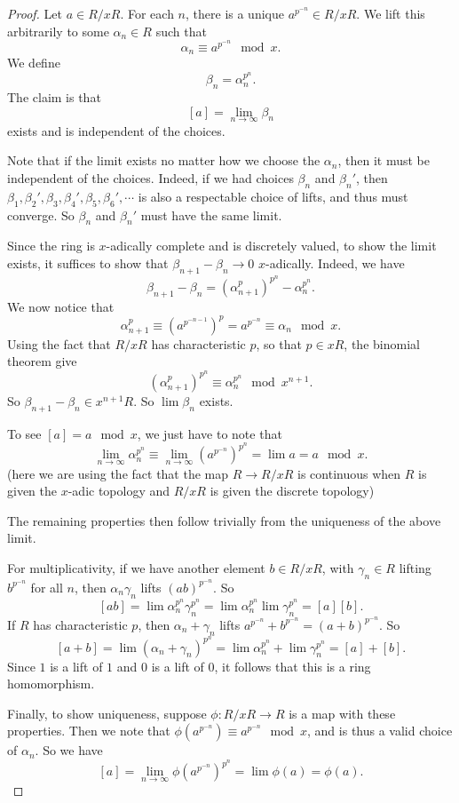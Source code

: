 \documentclass[a4paper]{article}
\begin{document}
\begin{proof}
  Let $a \in R/xR$. For each $n$, there is a unique $a^{p^{-n}} \in R/xR$. We lift this arbitrarily to some $\alpha_n \in R$ such that
  \[
    \alpha_n \equiv a^{p^{-n}} \mod x.
  \]
  We define
  \[
    \beta_n = \alpha_n^{p^n}.
  \]
  The claim is that
  \[
    [a] = \lim_{n \to \infty}\beta_n
  \]
  exists and is independent of the choices.

  Note that if the limit exists no matter how we choose the $\alpha_n$, then it must be independent of the choices. Indeed, if we had choices $\beta_n$ and $\beta_n'$, then $\beta_1, \beta_2', \beta_3, \beta_4', \beta_5, \beta_6', \cdots$ is also a respectable choice of lifts, and thus must converge. So $\beta_n$ and $\beta_n'$ must have the same limit.

  Since the ring is $x$-adically complete and is discretely valued, to show the limit exists, it suffices to show that $\beta_{n + 1} - \beta_n \to 0$ $x$-adically. Indeed, we have
  \[
    \beta_{n + 1} - \beta_n = (\alpha_{n + 1}^p)^{p^n} - \alpha_n^{p^n}.
  \]
  We now notice that
  \[
    \alpha_{n + 1}^p \equiv (a^{p^{-n - 1}})^p = a^{p^{-n}} \equiv \alpha_n \mod x.
  \]
  Using the fact that $R/xR$ has characteristic $p$, so that $p \in xR$, the binomial theorem give
  \[
    (\alpha_{n + 1}^p)^{p^n} \equiv \alpha_n^{p^n} \mod x^{n + 1}.
  \]
  So $\beta_{n + 1} - \beta_n \in x^{n + 1} R$. So $\lim \beta_n$ exists.

  To see $[a] = a\mod x$, we just have to note that
  \[
    \lim_{n \to \infty} \alpha_n^{p^n} \equiv \lim_{n \to \infty} (a^{p^{-n}})^{p^n} = \lim a = a \mod x.
  \]
  (here we are using the fact that the map $R \to R/xR$ is continuous when $R$ is given the $x$-adic topology and $R/xR$ is given the discrete topology)

  The remaining properties then follow trivially from the uniqueness of the above limit.

  For multiplicativity, if we have another element $b \in R/xR$, with $\gamma_n \in R$ lifting $b^{p^{-n}}$ for all $n$, then $\alpha_n \gamma_n$ lifts $(ab)^{p^{-n}}$. So
  \[
    [ab] = \lim\alpha_n^{p^n} \gamma_n^{p^n} = \lim \alpha_n^{p^n} \lim \gamma_n^{p^n} = [a][b].
  \]
  If $R$ has characteristic $p$, then $\alpha_n + \gamma_n$ lifts $a^{p^{-n}} + b^{p^{-n}} = (a + b)^{p^{-n}}$. So
  \[
    [a + b] = \lim (\alpha_n + \gamma_n)^{p^n} = \lim \alpha_n^{p^n} + \lim \gamma_n^{p^n} = [a] + [b].
  \]
  Since $1$ is a lift of $1$ and $0$ is a lift of $0$, it follows that this is a ring homomorphism.

  Finally, to show uniqueness, suppose $\phi: R/xR \to R$ is a map with these properties. Then we note that $\phi(a^{p^{-n}}) \equiv a^{p^{-n}} \mod x$, and is thus a valid choice of $\alpha_n$. So we have
  \[
    [a] = \lim_{n \to \infty} \phi(a^{p^{-n}})^{p^n} = \lim \phi(a) = \phi(a).
  \]
\end{proof}
\end{document}
